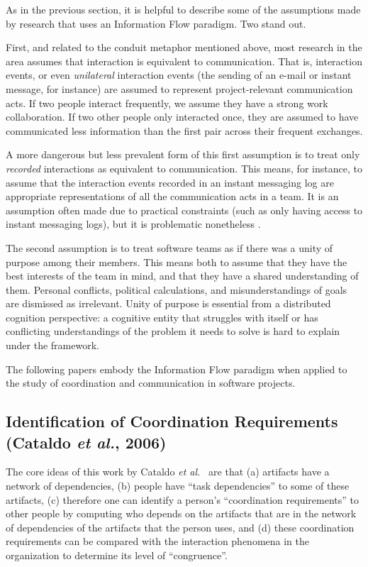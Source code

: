 As in the previous section, it is helpful to describe some of the assumptions made by research that uses an Information Flow paradigm. Two stand out.

First, and related to the conduit metaphor mentioned above, most research in the area assumes that interaction is equivalent to communication. That is, interaction events, or even \emph{unilateral} interaction events (the sending of an e-mail or instant message, for instance) are assumed to represent project-relevant communication acts. If two people interact frequently, we assume they have a strong work collaboration. If two other people only interacted once, they are assumed to have communicated less information than the first pair across their frequent exchanges. 

A more dangerous but less prevalent form of this first assumption is to treat only \emph{recorded} interactions as equivalent to communication. This means, for instance, to assume that the interaction events recorded in an instant messaging log are appropriate representations of all the communication acts in a team. It is an assumption often made due to practical constraints (such as only having access to instant messaging logs), but it is problematic nonetheless \cite{Aranda2009}.

The second assumption is to treat software teams as if there was a unity of purpose among their members. This means both to assume that they have the best interests of the team in mind, and that they have a shared understanding of them. Personal conflicts, political calculations, and misunderstandings of goals are dismissed as irrelevant. Unity of purpose is essential from a distributed cognition perspective: a cognitive entity that struggles with itself or has conflicting understandings of the problem it needs to solve is hard to explain under the framework.

The following papers embody the Information Flow paradigm when applied to the study of coordination and communication in software projects.


\subsection{Identification of Coordination Requirements (Cataldo \emph{et al.}, 2006)}
\label{sec:Cataldo}

The core ideas of this work by Cataldo \emph{et al.}\  are that (a) artifacts have a network of dependencies, (b) people have ``task dependencies'' to some of these artifacts, (c) therefore one can identify a person's ``coordination requirements'' to other people by computing who depends on the artifacts that are in the network of dependencies of the artifacts that the person uses, and (d) these coordination requirements can be compared with the interaction phenomena in the organization to determine its level of ``congruence''.

